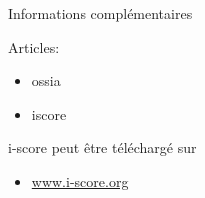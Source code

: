 \begin{block}{Informations complémentaires}
      \small{Articles:
      \begin{itemize}
        \item ossia
        \item iscore
      \end{itemize}
      \vspace{0.1in}\noindent i-score peut être téléchargé sur
      \begin{itemize}
        \item \url{www.i-score.org}
      \end{itemize}}
\end{block}